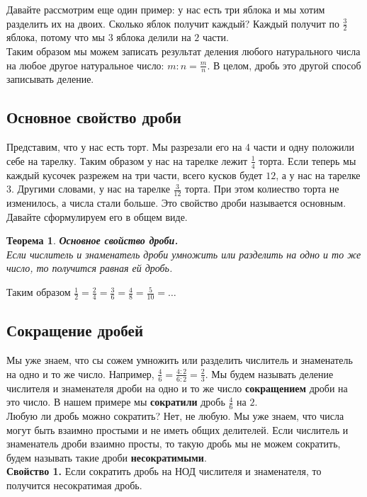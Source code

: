 \documentclass{article}
\begin{document}
Давайте рассмотрим еще один пример: у нас есть три яблока и мы хотим разделить их на двоих. Сколько яблок получит каждый? Каждый получит по $\frac 3{2}$ яблока, потому что мы $3$ яблока делили на $2$ части.\\

Таким образом мы можем записать результат деления любого натурального числа на любое другое натуральное число: $m : n = \frac m{n}$. В целом, дробь это другой способ записывать деление.
\subsection{Основное свойство дроби}
Представим, что у нас есть торт. Мы разрезали его на 4 части и одну положили себе на тарелку. Таким образом у нас на тарелке лежит $\frac 1{4}$ торта. Если теперь мы каждый кусочек разрежем на три части, всего кусков будет $12$, а у нас на тарелке $3$. Другими словами, у нас на тарелке $\frac 3{12}$ торта. При этом колиество торта не изменилось, а числа стали больше. Это свойство дроби называется основным. Давайте сформулируем его в общем виде.\\

 \newtheorem{Th}{Теорема}
 \begin{Th} \textbf{Основное свойство дроби.}\\
 Если числитель и знаменатель дроби умножить или разделить на одно и то же число, то получится равная ей дробь.
 \end{Th}
Таким образом $\frac1{2} = \frac 2{4} = \frac 3{6} = \frac 4{8} = \frac 5{10} = \dots$

\subsection{Сокращение дробей}
Мы уже знаем, что сы сожем умножить или разделить числитель и знаменатель на одно и то же число. Например, $\frac4{6} = \frac{4:2}{6:2} = \frac2{3}$. Мы будем называть деление числителя и знаменателя дроби на одно и то же число \textbf{сокращением} дроби на это число. В нашем примере мы \textbf{сократили} дробь $\frac4{6}$ на $2$.\\
Любую ли дробь можно сократить? Нет, не любую. Мы уже знаем, что числа могут быть взаимно простыми и не иметь общих делителей. Если числитель и знаменатель дроби взаимно просты, то такую дробь мы не можем сократить, будем называть такие дроби \textbf{несократимыми}.\\
\textbf{Свойство 1.} Если сократить дробь на НОД числителя и знаменателя, то получится несократимая дробь.
\end{document}
